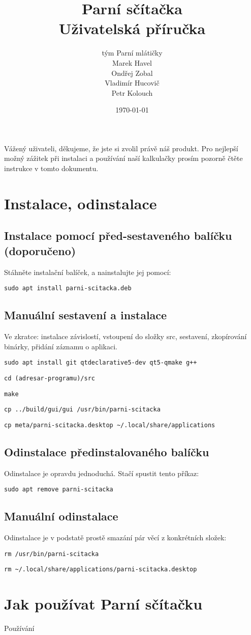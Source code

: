 \documentclass[a4paper]{article}
\title{\Huge Parní sčítačka\\\huge Uživatelská příručka}
\author{\LARGE tým Parní mlátičky \\ Marek Havel \\ Ondřej Zobal\\ Vladimír Hucovič\\ Petr Kolouch}
\date{\today}
\begin{document}
\maketitle

Vážený uživateli, děkujeme, že jste si zvolil právě náš produkt. Pro nejlepší možný zážitek při instalaci a používání naší kalkulačky prosím pozorně čtěte instrukce v tomto dokumentu.

\section*{Instalace, odinstalace}

\subsection*{Instalace pomocí před-sestaveného balíčku (doporučeno)}

Stáhněte instalační balíček, a nainstalujte jej pomocí:

\verb|sudo apt install parni-scitacka.deb|

\subsection*{Manuální sestavení a instalace}

Ve zkratce: instalace závislostí, vstoupení do složky src, sestavení, zkopírování binárky, přidání záznamu o aplikaci.

\verb|sudo apt install git qtdeclarative5-dev qt5-qmake g++|

\verb|cd (adresar-programu)/src|

\verb|make|

\verb|cp ../build/gui/gui /usr/bin/parni-scitacka|

\verb|cp meta/parni-scitacka.desktop ~/.local/share/applications|

\subsection*{Odinstalace předinstalovaného balíčku}

Odinstalace je opravdu jednoduchá. Stačí spustit tento příkaz:

\verb|sudo apt remove parni-scitacka|

\subsection*{Manuální odinstalace}

Odinstalace je v podstatě prostě smazání pár věcí z konkrétních složek:

\verb|rm /usr/bin/parni-scitacka|

\verb|rm ~/.local/share/applications/parni-scitacka.desktop|

\pagebreak
\section*{Jak používat Parní sčítačku}

Používání
\end{document}
